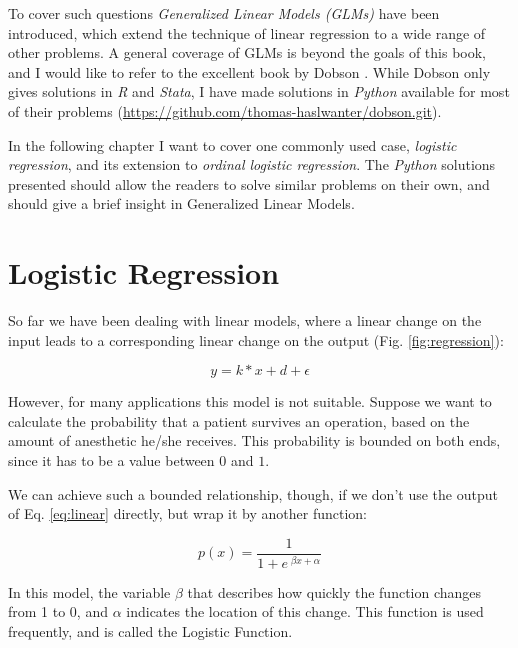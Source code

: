 To cover such questions \emph{Generalized Linear Models (GLMs)} have been introduced, which extend the technique of linear regression to a wide range of other problems. A general coverage of GLMs is beyond the goals of this book, and I would like to refer to the excellent book by Dobson \cite{Dobson2008}. While Dobson only gives solutions in \emph{R} and \emph{Stata}, I have made solutions in \emph{Python} available for most of their problems (\url{https://github.com/thomas-haslwanter/dobson.git}).

In the following chapter I want to cover one commonly used case, \emph{logistic regression}, and its extension to \emph{ordinal logistic regression}. The \emph{Python} solutions presented should allow the readers to solve similar problems on their own, and should give a brief insight in Generalized Linear Models.

\section{Logistic Regression}

So far we have been dealing with linear models, where a linear change on the input leads to a corresponding linear change on the output (Fig. \ref{fig:regression}):

 \begin{equation}\label{eq:linear}
   y = k*x + d + \epsilon
 \end{equation}

However, for many applications this model is not suitable. Suppose we want to calculate the probability that a patient survives an operation, based on the amount of anesthetic he/she receives. This probability is bounded on both ends, since it has to be a value between $0$ and $1$.

We can achieve such a bounded relationship, though, if we don't use the output of Eq. \ref{eq:linear} directly, but wrap it by another function:

\begin{equation}\label{eq:logisticFcn}
  p(x) = \frac{1}{ 1 + e^{ \;\beta x + \alpha } }
\end{equation}

In this model, the variable $\beta$ that describes how quickly the function changes from 1 to 0, and $\alpha$ indicates the location of this change. This function is used frequently, and is called the Logistic Function.

